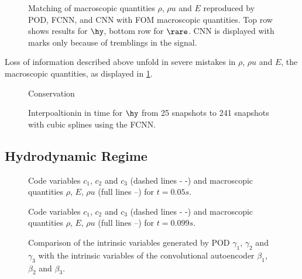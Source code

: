 \begin{figure}[htbp!]
	
	\caption{Matching of macroscopic quantities \(\rho\), \(\rho u\) and \(E\) reproduced by POD, FCNN, and CNN with FOM macroscopic quantities. Top row shows results for \(\hy\), bottom row for \(\rare\). CNN is displayed with marks only because of tremblings in the signal.}
	\label{Fig:ErrMacro}
\end{figure}
Loss of information described above unfold in severe mistakes in \(\rho\), \(\rho u\) and \(E\), the macroscopic quantities, as displayed in \cref{Fig:ErrMacro}.  
\begin{figure}
	
	\caption{Conservation}
\end{figure}
\begin{figure}
	
	\caption{Interpoaltionin in time for \(\hy\) from 25 snapshots to 241 snapshots with cubic splines using the FCNN.}
\end{figure}
\subsection{Hydrodynamic Regime}

\begin{figure}[!htbp]
	\scalebox{1}{}
	\caption{Code variables \(c_1\), \(c_2\) and \(c_3\) (dashed lines - -) and macroscopic quantities \(\rho\), \(E\), \(\rho u\) (full lines --) for \(t=0.05s\).}
\end{figure}
\begin{figure}[!htbp]
	\scalebox{1}{}
	\caption{Code variables \(c_1\), \(c_2\) and \(c_3\) (dashed lines - -) and macroscopic quantities \(\rho\), \(E\), \(\rho u\) (full lines --) for \(t=0.099s\).}
\end{figure}
\begin{figure}[!htbp]
	\scalebox{.6}{}
	\caption{Comparison of the intrinsic variables generated by POD \(\gamma_1\), \(\gamma_2\) and \(\gamma_3\) with the intrinsic variables of the convolutional autoencoder \(\beta_1\), \(\beta_2\) and \(\beta_3\).}
\end{figure}

